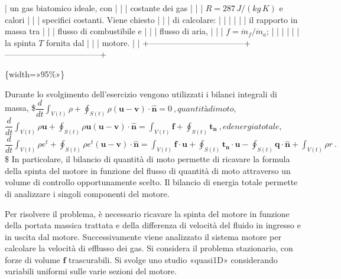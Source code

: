 \documentclass[letterpaper,10pt,italian]{jupyterBook}
\begin{document}
| un gas biatomico ideale, con      |                                   |
| costante dei gas                  |                                   |
| \(R = 287 \, J/(kg \, K)\) e calori |                                   |
| specifici costanti. Viene chiesto |                                   |
| di calcolare:                     |                                   |
|                                   |                                   |
| \sphinxhyphen{}   il rapporto in massa tra      |                                   |
|     flusso di combustibile e      |                                   |
|     flusso di aria,               |                                   |
|     \(f = \dot{m}_f / \dot{m}_a\);  |                                   |
|                                   |                                   |
| \sphinxhyphen{}   la spinta \(T\) fornita dal     |                                   |
|     motore.                       |                                   |
+———————————–+———————————–+

\sphinxAtStartPar
{}\{width=»95\%»\}

\sphinxAtStartPar
Durante lo svolgimento dell’esercizio vengono utilizzati i bilanci
integrali di massa,
\$\(\dfrac{d}{dt} \displaystyle\int_{V(t)} \rho + \oint_{S(t)} \rho (\bm{u}-\bm{v}) \cdot \bm{\hat{n}} = 0 \ ,\)\(
quantità di moto,
\)\(\dfrac{d}{dt} \displaystyle\int_{V(t)} \rho \bm{u} + \oint_{S(t)} \rho \bm{u} (\bm{u}-\bm{v}) \cdot \bm{\hat{n}}= \int_{V(t)} \bm{f} + \oint_{S(t)} \bm{t_n} \ ,\)\(
ed energia totale,
\)\(\dfrac{d}{dt} \displaystyle\int_{V(t)} \rho e^t + \oint_{S(t)} \rho e^t (\bm{u}-\bm{v}) \cdot \bm{\hat{n}}= \int_{V(t)} \bm{f} \cdot \bm{u} + \oint_{S(t)} \bm{t_n} \cdot \bm{u} - \oint_{S(t)} \bm{q} \cdot \bm{\hat{n}} + \int_{V(t)} \rho r \ .\)\$
In particolare, il bilancio di quantità di moto permette di ricavare la
formula della spinta del motore in funzione del flusso di quantità di
moto attraverso un volume di controllo opportunamente scelto. Il
bilancio di energia totale permette di analizzare i singoli componenti
del motore.

\sphinxAtStartPar
Per risolvere il problema, è necessario ricavare la spinta del motore in
funzione della portata massica trattata e della differenza di velocità
del fluido in ingresso e in uscita dal motore. Successivamente viene
analizzato il sistema motore per calcolare la velocità di efflusso dei
gas. Si considera il problema stazionario, con forze di volume \(\bm{f}\)
trascurabili. Si svolge uno studio «quasi\sphinxhyphen{}1D» considerando variabili
uniformi sulle varie sezioni del motore.
\end{document}
